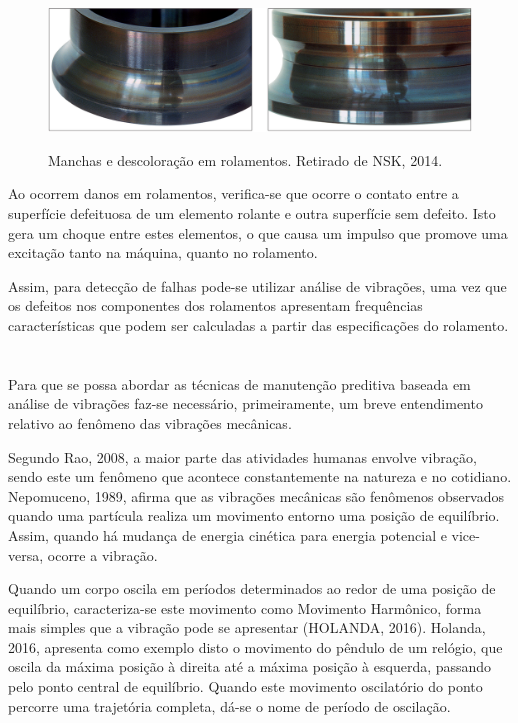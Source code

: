 \documentclass[
	12pt,				
	oneside,			
	a4paper,			
	english,			
	brazil,			
	]{abntex2ppgsi}
\begin{document}
\begin{figure}[H]
\centering
\caption {Manchas e descoloração em rolamentos. Retirado de NSK, 2014.}
\includegraphics[width=\textwidth,height=\textheight,keepaspectratio]{manchas_nsk}
\label{manchas_nsk}
\end{figure}

Ao ocorrem danos em rolamentos, verifica-se que ocorre o contato entre a superfície defeituosa de um elemento rolante e outra superfície sem defeito. Isto gera um choque entre estes elementos, o que causa um impulso que promove uma excitação tanto na máquina, quanto no rolamento. 

Assim, para detecção de falhas pode-se utilizar análise de vibrações, uma vez que os defeitos nos componentes dos rolamentos apresentam frequências características que podem ser calculadas a partir das especificações do rolamento. 

\newpage
\section{}

Para que se possa abordar as técnicas de manutenção preditiva baseada em análise de vibrações faz-se necessário, primeiramente, um breve entendimento relativo ao fenômeno das vibrações mecânicas. 

Segundo Rao, 2008, a maior parte das atividades humanas envolve vibração, sendo este um fenômeno que acontece constantemente na natureza e no cotidiano. Nepomuceno, 1989, afirma que as vibrações mecânicas são fenômenos observados quando uma partícula realiza um movimento entorno uma posição de equilíbrio. Assim, quando há mudança de energia cinética para energia potencial e vice-versa, ocorre a vibração. 

Quando um corpo oscila em períodos determinados ao redor de uma posição de equilíbrio, caracteriza-se este movimento como Movimento Harmônico, forma mais simples que a vibração pode se apresentar (HOLANDA, 2016). Holanda, 2016, apresenta como exemplo disto o movimento do pêndulo de um relógio, que oscila da máxima posição à direita até a máxima posição à esquerda, passando pelo ponto central de equilíbrio. Quando este movimento oscilatório do ponto percorre uma trajetória completa, dá-se o nome de período de oscilação.  
\end{document}
